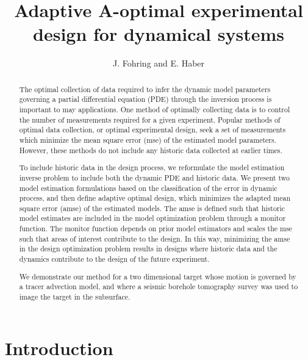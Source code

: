 \documentclass[11pt]{article}
\begin{document}
\title{ Adaptive A-optimal experimental design for dynamical systems}
\author{J. Fohring and E. Haber }
\maketitle


\begin{abstract}
The optimal collection of data required to infer the dynamic model parameters governing a partial differential equation (PDE) through the inversion process is important to may applications. 
One method of optimally collecting data is to control the number of measurements required for a given experiment. Popular methods of optimal data collection, or optimal experimental design, seek a set of measurements which minimize the mean square error (mse)  of the estimated model parameters. However, these methods do not include any historic data collected at earlier times. 

 To include historic data in the design process, we reformulate the model estimation inverse problem to include both the dynamic PDE and historic data. We present two model estimation formulations based on the classification of the error in dynamic process, and then define  adaptive optimal design, which minimizes the adapted  mean square error (amse) of the estimated models. The amse is defined such that historic model estimates are included in the model optimization problem through a monitor function. The monitor function depends on prior model estimators and scales the mse such that areas of interest  contribute  to the design. In this way, minimizing the amse in the design optimization problem results in designs where historic  data and the dynamics contribute to the design of the future experiment.

We demonstrate our method for a two dimensional target whose motion is governed by a tracer advection model, and where a seismic borehole tomography survey was used to image the target in the subsurface.  
 


\end{abstract}


\section{Introduction}
\end{document}
